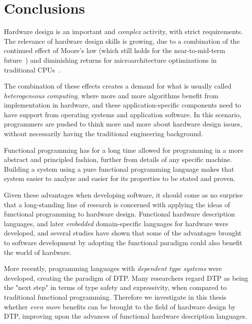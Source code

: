 \chapter{Conclusions}
\label{chap:conclusions}

    Hardware design is an important and \emph{complex} activity, with strict requirements.
    The relevance of hardware design skills is growing,
    due to a combination of the continued effect of Moore's law
    (which still holds for the near-to-mid-term future~\cite{itrs}) and
    diminishing returns for microarchitecture optimizations in traditional CPUs~\cite{dark-silicon}.

    The combination of these effects creates a demand for what is usually called
    \emph{heterogeneous computing}, where more and more algorithms benefit from
    implementation in hardware, and these application-specific components need to have
    support from operating systems and application software.
    In this scenario, programmers are pushed to think more and more about
    hardware design issues, without necessarily having the traditional engineering background.

    Functional programming has for a long time allowed for programming in a more
    abstract and principled fashion, further from details of any specific machine.
    Building a system using a pure functional programming language
    makes that system easier to analyze and easier for its properties to be stated and proven.

    Given these advantages when developing software, it should come as no surprise that
    a long-standing line of research is concerned with applying the ideas of functional
    programming to hardware design.
    Functional hardware description languages, and later
    \emph{embedded} domain-specific languages for hardware were developed,
    and several studies have shown that some of the advantages brought to software development
    by adopting the functional paradigm could also benefit the world of hardware.

    More recently, programming languages with \emph{dependent type systems} were developed,
    creating the paradigm of \acf{DTP}.
    Many researchers regard \ac{DTP} as being the "next step" in terms of type safety
    and expressivity, when compared to traditional functional programming.
    Therefore we investigate in this thesis whether \emph{even more} benefits
    can be brought to the field of hardware design by \ac{DTP},
    improving upon the advances of functional hardware description languages.

